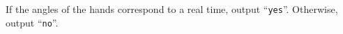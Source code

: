 
    If the angles of the hands correspond to a real time, output ``\texttt{yes}''.
    Otherwise, output ``\texttt{no}''.
